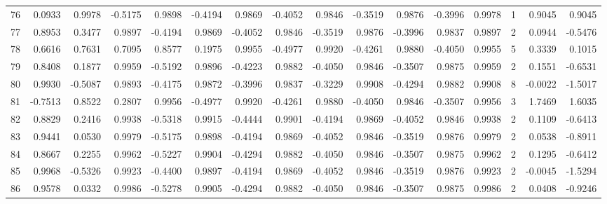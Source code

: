 \begin{tabular}{lrrrrrrrrrrrrrrr}
76  &      0.0933 &  0.9978 & -0.5175 &  0.9898 & -0.4194 &  0.9869 & -0.4052 &  0.9846 & -0.3519 &  0.9876 &  -0.3996 &     0.9978 &      1 &                    0.9045 &                     0.9045 \\
77  &      0.8953 &  0.3477 &  0.9897 & -0.4194 &  0.9869 & -0.4052 &  0.9846 & -0.3519 &  0.9876 & -0.3996 &   0.9837 &     0.9897 &      2 &                    0.0944 &                    -0.5476 \\
78  &      0.6616 &  0.7631 &  0.7095 &  0.8577 &  0.1975 &  0.9955 & -0.4977 &  0.9920 & -0.4261 &  0.9880 &  -0.4050 &     0.9955 &      5 &                    0.3339 &                     0.1015 \\
79  &      0.8408 &  0.1877 &  0.9959 & -0.5192 &  0.9896 & -0.4223 &  0.9882 & -0.4050 &  0.9846 & -0.3507 &   0.9875 &     0.9959 &      2 &                    0.1551 &                    -0.6531 \\
80  &      0.9930 & -0.5087 &  0.9893 & -0.4175 &  0.9872 & -0.3996 &  0.9837 & -0.3229 &  0.9908 & -0.4294 &   0.9882 &     0.9908 &      8 &                   -0.0022 &                    -1.5017 \\
81  &     -0.7513 &  0.8522 &  0.2807 &  0.9956 & -0.4977 &  0.9920 & -0.4261 &  0.9880 & -0.4050 &  0.9846 &  -0.3507 &     0.9956 &      3 &                    1.7469 &                     1.6035 \\
82  &      0.8829 &  0.2416 &  0.9938 & -0.5318 &  0.9915 & -0.4444 &  0.9901 & -0.4194 &  0.9869 & -0.4052 &   0.9846 &     0.9938 &      2 &                    0.1109 &                    -0.6413 \\
83  &      0.9441 &  0.0530 &  0.9979 & -0.5175 &  0.9898 & -0.4194 &  0.9869 & -0.4052 &  0.9846 & -0.3519 &   0.9876 &     0.9979 &      2 &                    0.0538 &                    -0.8911 \\
84  &      0.8667 &  0.2255 &  0.9962 & -0.5227 &  0.9904 & -0.4294 &  0.9882 & -0.4050 &  0.9846 & -0.3507 &   0.9875 &     0.9962 &      2 &                    0.1295 &                    -0.6412 \\
85  &      0.9968 & -0.5326 &  0.9923 & -0.4400 &  0.9897 & -0.4194 &  0.9869 & -0.4052 &  0.9846 & -0.3519 &   0.9876 &     0.9923 &      2 &                   -0.0045 &                    -1.5294 \\
86  &      0.9578 &  0.0332 &  0.9986 & -0.5278 &  0.9905 & -0.4294 &  0.9882 & -0.4050 &  0.9846 & -0.3507 &   0.9875 &     0.9986 &      2 &                    0.0408 &                    -0.9246 \\

\end{tabular}
